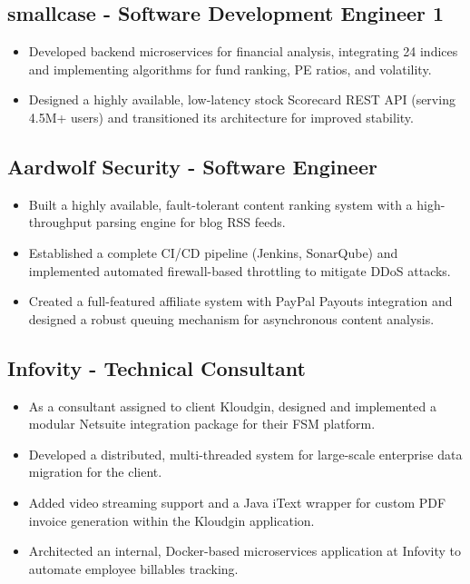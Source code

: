 \documentclass[11pt]{article}
\begin{document}
\subsection{\textbf{smallcase} - Software Development Engineer 1  }
\begin{itemize}[nosep, leftmargin=*]
    \item Developed backend microservices for financial analysis, integrating 24 indices and implementing algorithms for fund ranking, PE ratios, and volatility.
    \item Designed a highly available, low-latency stock Scorecard REST API (serving 4.5M+ users) and transitioned its architecture for improved stability.
\end{itemize}

\subsection{\textbf{Aardwolf Security} - Software Engineer  }
\begin{itemize}[nosep, leftmargin=*]
    \item Built a highly available, fault-tolerant content ranking system with a high-throughput parsing engine for blog RSS feeds.
    \item Established a complete CI/CD pipeline (Jenkins, SonarQube) and implemented automated firewall-based throttling to mitigate DDoS attacks.
    \item Created a full-featured affiliate system with PayPal Payouts integration and designed a robust queuing mechanism for asynchronous content analysis.
\end{itemize}

\subsection{\textbf{Infovity} - Technical Consultant  }
\begin{itemize}[nosep, leftmargin=*]
    \item As a consultant assigned to client Kloudgin, designed and implemented a modular Netsuite integration package for their FSM platform.
    \item Developed a distributed, multi-threaded system for large-scale enterprise data migration for the client.
    \item Added video streaming support and a Java iText wrapper for custom PDF invoice generation within the Kloudgin application.
    \item Architected an internal, Docker-based microservices application at Infovity to automate employee billables tracking.
\end{itemize}
\end{document}
